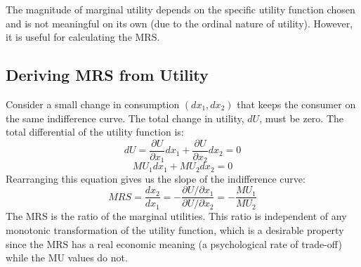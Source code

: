 The magnitude of marginal utility depends on the specific utility function chosen and is not meaningful on its own (due to the ordinal nature of utility). However, it is useful for calculating the MRS\@.

\subsection{Deriving MRS from Utility}
Consider a small change in consumption $(dx_1, dx_2)$ that keeps the consumer on the same indifference curve. The total change in utility, $dU$, must be zero. The total differential of the utility function is:
\[ dU = \frac{\partial U}{\partial x_1}dx_1 + \frac{\partial U}{\partial x_2}dx_2 = 0 \]
\[ MU_1 dx_1 + MU_2 dx_2 = 0 \]
Rearranging this equation gives us the slope of the indifference curve:
\begin{equation}
    MRS = \frac{dx_2}{dx_1} = - \frac{\partial U / \partial x_1}{\partial U / \partial x_2} = - \frac{MU_1}{MU_2}
\end{equation}
The MRS is the ratio of the marginal utilities. This ratio is independent of any monotonic transformation of the utility function, which is a desirable property since the MRS has a real economic meaning (a psychological rate of trade-off) while the MU values do not.